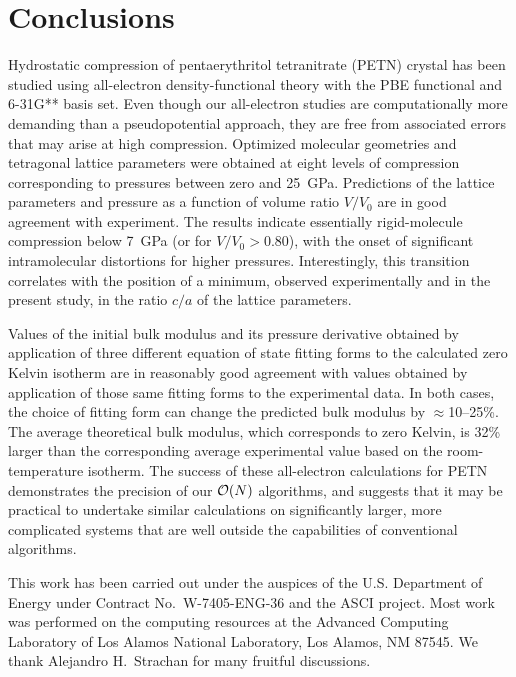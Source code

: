 \documentclass[prb,aps,nobibnotes,superbib,preprint]{revtex4}
\begin{document}
\section{Conclusions}
\label{sec:conclusions}
Hydrostatic compression of pentaerythritol tetranitrate (PETN) crystal
has been studied using all-electron density-functional theory with the
PBE functional and 6-31G** basis set. Even though our all-electron
studies are computationally more demanding than a pseudopotential
approach, they are free from associated errors that may arise 
at high compression.  Optimized molecular
geometries and tetragonal lattice parameters were obtained at eight
levels of compression corresponding to pressures between zero and
25~GPa.  Predictions of the lattice parameters and pressure as a
function of volume ratio $V/V_0$ are in good agreement with
experiment. The results indicate essentially rigid-molecule
compression below 7~GPa (or for $V/V_0 > 0.80$), with the onset of
significant intramolecular distortions for higher pressures.  
Interestingly, this transition correlates with the position of a
minimum, observed experimentally and in the present study, in the 
ratio $c/a$ of the lattice parameters.

Values of the initial bulk modulus and its pressure derivative
obtained by application of three different equation of state fitting
forms to the calculated zero Kelvin isotherm are in reasonably good
agreement with values obtained by application of those same fitting
forms to the experimental data.  In both cases, the choice of fitting
form can change the predicted bulk modulus by $\approx$10--25\%.  The
average theoretical bulk modulus, which corresponds to zero Kelvin,
is 32\% larger than the corresponding average experimental value based
on the room-temperature isotherm.  The success of these all-electron
calculations for PETN demonstrates the precision of our ${\cal O}(N)$ 
algorithms, and suggests that it may be practical to undertake 
similar calculations on significantly larger, more complicated systems 
that are well outside the capabilities of conventional algorithms. 

\begin{acknowledgments}
This work has been carried out under the auspices of the
U.S. Department of Energy under Contract No.~W-7405-ENG-36 and the
ASCI project.  Most work was performed on the computing resources at
the Advanced Computing Laboratory of Los Alamos National Laboratory,
Los Alamos, NM 87545.  We thank Alejandro H.~Strachan for many
fruitful discussions.
\end{acknowledgments}
\end{document}
